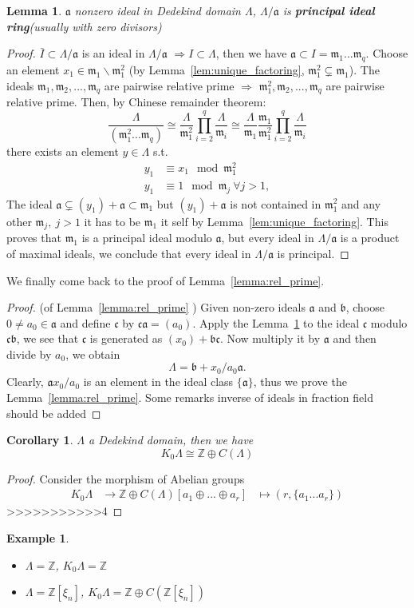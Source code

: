 \documentclass[11pt]{article}
\newtheorem{lemma}[thm]{Lemma}
\newtheorem{cor}[thm]{Corollary}
\newtheorem{ex}[thm]{Example}
\newcommand{\intg}{\mathbb Z}
\newcommand{\sca}{{\mathfrak a}}
\newcommand{\scb}{{\mathfrak b}}
\newcommand{\scc}{{\mathfrak c}}
\newcommand{\scm}{{\mathfrak m}}
\newcommand{\lrta}{\longrightarrow}
\newcommand{\Lrta}{\Longrightarrow}
\begin{document}
\begin{lemma}\label{lem:PIR}
$\sca$ nonzero ideal in Dedekind domain $\Lambda$,
$\Lambda/\sca$ is \textbf{principal ideal ring}(usually with zero divisors)
\end{lemma}
\begin{proof}
$\bar{I}\subset \Lambda/\sca$ is an ideal in $\Lambda/\sca$
$\Lrta I\subset \Lambda$, then we have $\sca\subset I=\scm_1...\scm_q$.
Choose an element $x_1\in \scm_1\backslash \scm_1^2$ (by Lemma~\ref{lem:unique_factoring}, $\scm_1^2\subsetneq\scm_1$).  The ideals $\scm_1,\scm_2,...,\scm_q$ are pairwise relative prime $\Lrta$ $\scm_1^2,\scm_2,...,\scm_q$ are pairwise relative prime. Then, by Chinese remainder theorem:
$$
\frac{\Lambda}{(\scm_1^2...\scm_q)}\cong\frac{\Lambda}{\scm_1^2}\prod_{i=2}^q\frac{\Lambda}{\scm_i}\cong\frac{\Lambda}{\scm_1}\frac{\scm_1}{\scm_1^2}\prod_{i=2}^q\frac{\Lambda}{\scm_i}
$$
there exists an element $y\in \Lambda$ s.t.
$$
\begin{aligned}
y_1&\equiv x_1\mod \scm_1^2\\
y_1&\equiv 1\mod \scm_j\ \forall j>1, 
\end{aligned}
$$
The ideal $\sca\subsetneq(y_1)+\sca\subset\scm_1$ but $(y_1)+\sca$ is not contained in $\scm_1^2$ and any other $\scm_j,\ j>1$ it has to be $\scm_1$ it self by Lemma~\ref{lem:unique_factoring}. This proves that $\scm_1$ is a principal ideal modulo $\sca$, but every ideal in $\Lambda/\sca$ is a product of maximal ideals, we conclude that every ideal in $\Lambda/\sca$ is principal.
\end{proof}
We finally come back to the proof of Lemma~\ref{lemma:rel_prime}.
\begin{proof}
(of Lemma~\ref{lemma:rel_prime} )
Given non-zero ideals $\sca$ and $\scb$, choose $0\neq a_0\in \sca$ and define $\scc$ by $\scc\sca=(a_0)$. Apply the Lemma~\ref{lem:PIR} to the ideal $\scc$ modulo $\scc\scb$, we see that $\scc$ is generated as $(x_0)+\scb\scc$. Now multiply it by $\sca$ and then divide by $a_0$, we obtain
$$
\Lambda=\scb+ x_0/a_0\sca.
$$
Clearly, $\sca x_0/a_0$ is an element in the ideal class $\{\sca\}$, thus we prove the Lemma~\ref{lemma:rel_prime}. {\color{red}Some remarks inverse of ideals in fraction field should be added}
\end{proof}

\begin{cor}
$\Lambda$ a Dedekind domain, then we have 
$$
K_0\Lambda\cong \intg\oplus C(\Lambda)
$$
\end{cor}
\begin{proof}
Consider the morphism of Abelian groups
$$
\begin{aligned}
K_0\Lambda&\lrta \intg \oplus C(\Lambda)
[a_1\oplus...\oplus a_r]&\mapsto (r,\{a_1...a_r\})
\end{aligned}
$$
>>>>>>>>>>>4
\end{proof}
\begin{ex}
\begin{itemize}
\item
$\Lambda=\intg$, $K_0\Lambda=\intg$
\item
$\Lambda=\intg[\xi_n]$, $K_0\Lambda=\intg\oplus C(\intg[\xi_n])$
\end{itemize}
\end{ex}
\end{document}
